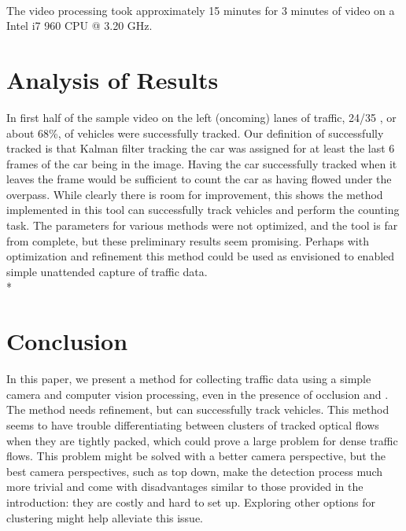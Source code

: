 \documentclass{article} %
\begin{document}
\paragraph{}The video processing took approximately 15 minutes for 3 minutes of video on a Intel i7 960 CPU @ 3.20 GHz.



\section{Analysis of Results}
In first half of the sample video on the left (oncoming) lanes of traffic, 24/35 , or about 68\%, of vehicles were successfully tracked. Our definition of successfully tracked is that Kalman filter tracking the car was assigned for at least the last 6 frames of the car being in the image. Having the car successfully tracked when it leaves the frame would be sufficient to count the car as having flowed under the overpass.  While clearly there is room for improvement, this shows the method implemented in this tool can successfully track vehicles and perform the counting task. The parameters for various methods were not optimized, and the tool is far from complete, but these preliminary results seem promising. Perhaps with optimization and refinement this method could be used as envisioned to enabled simple unattended capture of traffic data.\\*


\section{Conclusion}

In this paper, we present a method for collecting traffic data using a simple camera and computer vision processing, even in the presence of occlusion and . The method needs refinement, but can successfully track vehicles. This method seems to have trouble differentiating between clusters of tracked optical flows when they are tightly packed, which could prove a large problem for dense traffic flows. This problem might be solved with a better camera perspective, but the best camera perspectives, such as top down, make the detection process much more trivial and come with disadvantages similar to those provided in the introduction: they are costly and hard to set up. Exploring other options for clustering might help alleviate this issue.
\paragraph{}

\nocite{*}


\end{document}
